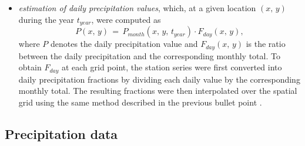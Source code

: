 \begin{itemize}[label=$\blacktriangleright$]
    scheme allowed the weights to decrease more gradually in areas with a lower station density, while limiting the influence of less compatible stations 
    whenever there was high data availability.
    \item \textit{estimation of daily precipitation values}, which, at a given location $\left(x,\,y\right)$ during the year $t_{year}$, were computed as 
    \begin{equation}
        P\left(x,\,y\right)\,=\,P_{month}\left(x,\,y,\,t_{year}\right) \cdot F_{day}\left(x,\,y\right),
        \label{eq:daily_precipitation_gridding}
    \end{equation}
    where $P$ denotes the daily precipitation value and $F_{day}\left(x,\,y\right)$ is the ratio between the daily precipitation and the corresponding monthly 
    total. To obtain $F_{day}$ at each grid point, the station series were first converted into daily precipitation fractions by dividing each daily value 
    by the corresponding monthly total. The resulting fractions were then interpolated over the spatial grid using the same method described in the previous 
    bullet point \parencite{precipitation_IHGAR}.
\end{itemize}



\subsection{Precipitation data}

